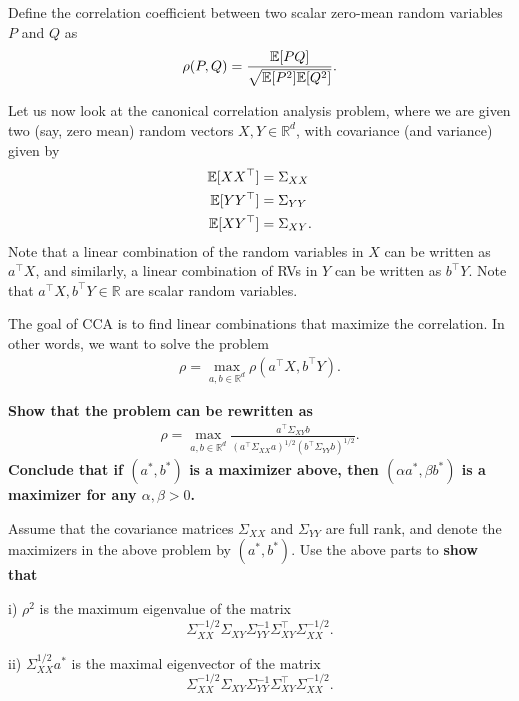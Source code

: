 \begin{Parts}

\Part Define the correlation coefficient between two scalar zero-mean random variables $P$ and $Q$ as
\begin{align*}
\rho(P, Q) = \frac{\mathbb{E} [PQ]}{\sqrt{\mathbb{E}[P^2] \mathbb{E}[Q^2]}}.
\end{align*}

Let us now look at the canonical correlation analysis problem, where we are given two (say, zero mean) random vectors $X, Y \in \mathbb{R}^d$, with covariance (and variance) given by
\begin{align*}
\mathbb{E} [XX^\top] &= \Sigma_{XX} \\
\mathbb{E} [YY^\top] &= \Sigma_{YY} \\
\mathbb{E} [XY^\top] &= \Sigma_{XY}.
\end{align*}
Note that a linear combination of the random variables in $X$ can be written as $a^\top X$, and similarly, a linear combination of RVs in $Y$ can be written as $b^\top Y$. Note that $a^\top X, b^\top Y \in \mathbb{R}$ are scalar random variables. 

The goal of CCA is to find linear combinations that maximize the correlation. In other words, we want to solve the problem
\begin{align*}
\rho = \max_{a, b \in \mathbb{R}^d} \rho(a^\top X, b^\top Y).
\end{align*}

{\bf Show that the problem can be rewritten as
\begin{align*}
\rho = \max_{a, b \in \mathbb{R}^d} \frac{a^\top \Sigma_{XY} b}{ \left( a^\top \Sigma_{XX} a\right)^{1/2} \left( b^\top \Sigma_{YY} b\right)^{1/2} }.
\end{align*}
Conclude that if $(a^*, b^*)$ is a maximizer above, then $(\alpha a^*, \beta b^*)$ is a maximizer for any $\alpha, \beta > 0$.}




\Part Assume that the covariance matrices $\Sigma_{XX}$ and $\Sigma_{YY}$ are full rank, and denote the maximizers in the above problem by $(a^*, b^*)$. Use the above parts to {\bf show that}

i) $\rho^2$ is the maximum eigenvalue of the matrix $$\Sigma_{XX}^{-1/2} \Sigma_{XY} \Sigma_{YY}^{-1} \Sigma_{XY}^\top \Sigma_{XX}^{-1/2}.$$

ii) $\Sigma_{XX}^{1/2} a^*$ is the maximal eigenvector of the matrix $$\Sigma_{XX}^{-1/2} \Sigma_{XY} \Sigma_{YY}^{-1} \Sigma_{XY}^\top \Sigma_{XX}^{-1/2}.$$


\end{Parts}
